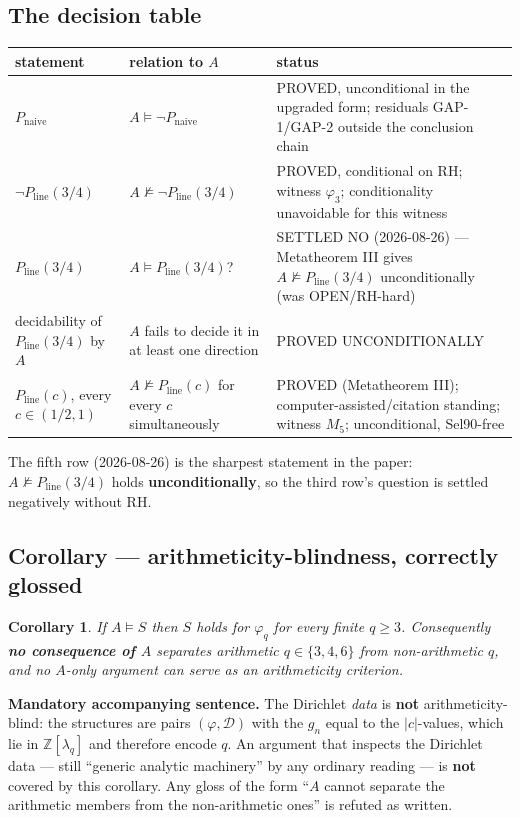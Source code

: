 \documentclass[11pt]{amsart}
\newtheorem{corollary}[theorem]{Corollary}
\theoremstyle{remark}
\begin{document}
\subsection{The decision table}

\begin{center}
\begin{tabular}{p{4.3cm}p{4cm}p{4.3cm}}
\hline
statement & relation to $A$ & status \\
\hline
$P_{\mathrm{naive}}$ & $A\models\neg P_{\mathrm{naive}}$ & PROVED, unconditional in the upgraded form; residuals GAP-1/GAP-2 outside the conclusion chain \\
$\neg P_{\mathrm{line}}(3/4)$ & $A\nvDash\neg P_{\mathrm{line}}(3/4)$ & PROVED, conditional on RH; witness $\varphi_3$; conditionality unavoidable for this witness \\
$P_{\mathrm{line}}(3/4)$ & $A\models P_{\mathrm{line}}(3/4)$? & SETTLED NO (2026-08-26) --- Metatheorem III gives $A\nvDash P_{\mathrm{line}}(3/4)$ unconditionally (was OPEN/RH-hard) \\
decidability of $P_{\mathrm{line}}(3/4)$ by $A$ & $A$ fails to decide it in at least one direction & PROVED UNCONDITIONALLY \\
$P_{\mathrm{line}}(c)$, every $c\in(1/2,1)$ & $A\nvDash P_{\mathrm{line}}(c)$ for every $c$ simultaneously & PROVED (Metatheorem III); computer-assisted/citation standing; witness $M_5$; unconditional, Sel90-free \\
\hline
\end{tabular}
\end{center}

The fifth row (2026-08-26) is the sharpest statement in the paper:
$A\nvDash P_{\mathrm{line}}(3/4)$ holds \textbf{unconditionally}, so the
third row's question is settled negatively without RH.

\subsection{Corollary --- arithmeticity-blindness, correctly glossed}

\begin{corollary}
\label{cor:blindness}
If $A\models S$ then $S$ holds for $\varphi_q$ for every finite $q\ge3$.
Consequently \textbf{no consequence of $A$} separates arithmetic
$q\in\{3,4,6\}$ from non-arithmetic $q$, and no $A$-only argument can
serve as an arithmeticity criterion.
\end{corollary}

\textbf{Mandatory accompanying sentence.} The Dirichlet \emph{data} is
\textbf{not} arithmeticity-blind: the structures are pairs
$(\varphi,\mathcal D)$ with the $g_n$ equal to the $|c|$-values, which
lie in $\mathbb Z[\lambda_q]$ and therefore encode $q$. An argument that
inspects the Dirichlet data --- still ``generic analytic machinery'' by
any ordinary reading --- is \textbf{not} covered by this corollary. Any
gloss of the form ``$A$ cannot separate the arithmetic members from the
non-arithmetic ones'' is refuted as written.
\end{document}
